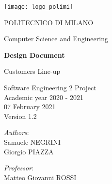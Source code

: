 \begin{titlingpage}
	\begin{center}
		\texttt{[image: logo\_polimi]}

		\vspace{0.25cm}

		\LARGE POLITECNICO DI MILANO\\

		\vspace{0.2cm}

		\Large Computer Science and Engineering

		\vspace{0.8cm}

		\Huge \textbf{Design Document}

		\vspace{0.5cm}
		\huge Customers Line-up

		\vspace{1.5cm}
		\LARGE Software Engineering 2 Project\\
		\Large Academic year 2020 - 2021\\
		\vspace{1cm}
		07 February 2021\\Version 1.2
		\vspace{3cm}

		\large
		\begin{minipage}{.1\textwidth}
			\null
		\end{minipage}%
		\begin{minipage}{.4\textwidth}
			\textit{Authors}:\\
			Samuele NEGRINI\\
			Giorgio PIAZZA
		\end{minipage}%
		\begin{minipage}{.4\textwidth}
			\raggedleft
			\textit{Professor}:\\
			Matteo Giovanni ROSSI\\
			\phantom{placeholder}
		\end{minipage}%
		\begin{minipage}{.1\textwidth}
			\null
		\end{minipage}


		\end{center}
\end{titlingpage}